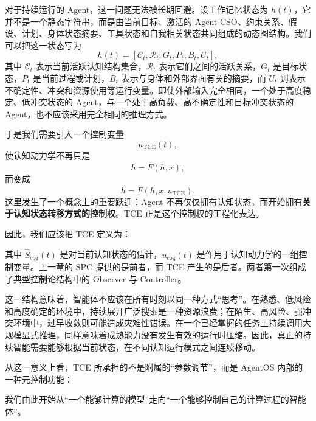 对于持续运行的 Agent，这一问题无法被长期回避。设工作记忆状态为 $h(t)$，它并不是一个静态字符串，而是由当前目标、激活的 Agent-CSO、约束关系、假设、计划、身体状态摘要、工具状态和自我相关状态共同组成的动态图结构。我们可以把这一状态写为
\begin{equation}
    h(t)=
    \left[
    \mathcal C_t,
    \mathcal R_t,
    G_t,
    P_t,
    B_t,
    U_t
    \right],
\end{equation}
其中 $\mathcal C_t$ 表示当前活跃认知结构集合，$\mathcal R_t$ 表示它们之间的活跃关系，$G_t$ 是目标状态，$P_t$ 是当前过程或计划，$B_t$ 表示与身体和外部界面有关的摘要，而 $U_t$ 则表示不确定性、冲突和资源使用等运行变量。即使外部输入完全相同，一个处于高度稳定、低冲突状态的 Agent，与一个处于高负载、高不确定性和目标冲突状态的 Agent，也不应该采用完全相同的推理方式。

于是我们需要引入一个控制变量
\begin{equation}
    u_{\mathrm{TCE}}(t),
\end{equation}
使认知动力学不再只是
\begin{equation}
    \dot h = F(h,x),
\end{equation}
而变成
\begin{equation}
    \dot h
    =
    F\!\left(
    h,
    x,
    u_{\mathrm{TCE}}
    \right).
\end{equation}
这里发生了一个概念上的重要跃迁：Agent 不再仅仅拥有认知状态，而开始拥有\textbf{关于认知状态转移方式的控制权}。TCE 正是这个控制权的工程化表达。

因此，我们应该把 TCE 定义为：
\begin{statementbox}
\centering
{}
\end{statementbox}
其中 $\widehat S_{\mathrm{cog}}(t)$ 是对当前认知状态的估计，$u_{\mathrm{cog}}(t)$ 是作用于认知动力学的一组控制变量。上一章的 SPC 提供的是前者，而 TCE 产生的是后者。两者第一次组成了典型控制论结构中的 Observer 与 Controller。

这一结构意味着，智能体不应该在所有时刻以同一种方式“思考”。在熟悉、低风险和高度确定的环境中，持续展开广泛搜索是一种资源浪费；在陌生、高风险、强冲突环境中，过早收敛则可能造成灾难性错误。在一个已经掌握的任务上持续调用大规模显式推理，同样意味着成熟能力没有发生有效的运行时压缩。因此，真正的持续智能需要能够根据当前状态，在不同认知运行模式之间连续移动。

从这一意义上看，TCE 所承担的不是附属的“参数调节”，而是 AgentOS 内部的一种元控制功能：
\begin{statementbox}
\centering
{}
\end{statementbox}
我们由此开始从“一个能够计算的模型”走向“一个能够控制自己的计算过程的智能体”。

